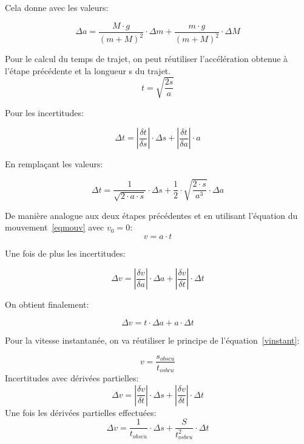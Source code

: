 Cela donne avec les valeurs:

\begin{equation}
    \Delta a = \frac{M \cdot g}{(m+M)^2} \cdot \Delta m + \frac{m \cdot g}{(m+M)^2} \cdot \Delta M
\end{equation}


Pour le calcul du temps de trajet, on peut réutiliser l'accélération obtenue à l'étape précédente et la longueur s du trajet.
\begin{equation}
    t = \sqrt{\frac{2s}{a}}
\end{equation}

Pour les incertitudes:

\begin{equation}
    \Delta t = |\frac{\delta t}{\delta s}| \cdot \Delta s + |\frac{\delta t}{\delta a}| \cdot a
\end{equation}

En remplaçant les valeurs:

\begin{equation}
    \Delta t = \frac{1}{\sqrt{2\cdot a \cdot s}}\cdot \Delta s + \frac{1}{2} \cdot \sqrt{\frac{2\cdot s}{a^3}}\cdot \Delta a
\end{equation}

De manière analogue aux deux étapes précédentes et en utilisant l'équation du mouvement~\eqref{eqmouv} avec $v_0=0$:
\begin{equation}
    v=a\cdot t
\end{equation}

Une fois de plus les incertitudes:

\begin{equation}
    \Delta v = |\frac{\delta v}{\delta a}|\cdot \Delta a + |\frac{\delta v}{\delta t}|\cdot \Delta t
\end{equation}

On obtient finalement:

\begin{equation}
    \Delta v = t \cdot \Delta a + a \cdot \Delta t
\end{equation}

Pour la vitesse instantanée, on va réutiliser le principe de l'équation~\eqref{vinstant}:

\begin{equation}
    v= \frac{s_{obscu}}{t_{osbcu}}
\end{equation}
Incertitudes avec dérivées partielles:
\begin{equation}
    \Delta v = |\frac{\delta v}{\delta t}|\cdot \Delta s + |\frac{\delta v}{\delta t}|\cdot \Delta t
\end{equation}
Une fois les dérivées partielles effectuées:
\begin{equation}
    \Delta v = \frac{1}{t_{obscu}}\cdot \Delta s + \frac{S}{t_{osbcu}^2}\cdot \Delta t
\end{equation}

